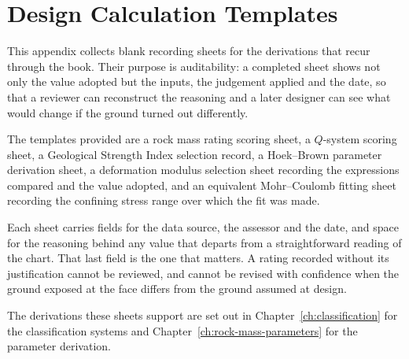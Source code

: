 \chapter{Design Calculation Templates}
\label{app:templates}

This appendix collects blank recording sheets for the derivations that recur
through the book. Their purpose is auditability: a completed sheet shows not
only the value adopted but the inputs, the judgement applied and the date, so
that a reviewer can reconstruct the reasoning and a later designer can see
what would change if the ground turned out differently.

The templates provided are a rock mass rating scoring sheet, a $Q$-system
scoring sheet, a Geological Strength Index selection record, a Hoek--Brown
parameter derivation sheet, a deformation modulus selection sheet recording
the expressions compared and the value adopted, and an equivalent
Mohr--Coulomb fitting sheet recording the confining stress range over which
the fit was made.

Each sheet carries fields for the data source, the assessor and the date, and
space for the reasoning behind any value that departs from a straightforward
reading of the chart. That last field is the one that matters. A rating
recorded without its justification cannot be reviewed, and cannot be revised
with confidence when the ground exposed at the face differs from the ground
assumed at design.

The derivations these sheets support are set out in
Chapter~\ref{ch:classification} for the classification systems and
Chapter~\ref{ch:rock-mass-parameters} for the parameter derivation.

